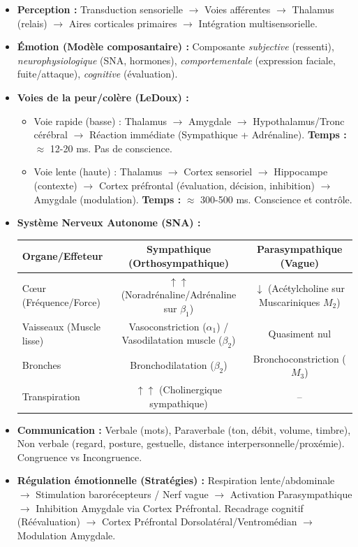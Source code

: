 \documentclass[11pt]{article}
\newcommand{\cle}[1]{{\popxbold\color{popdark}#1}}
\newcounter{popsec}
\newcounter{popsub}
\newcommand{\courssub}[1]{%
  \stepcounter{popsub}%
  \par\vspace{9pt}\noindent{\popxbold\fontsize{11.5}{13}\selectfont\color{popink}{\color{poporange}\thepopsec.\thepopsub}\hspace{6pt}#1}\par\nopagebreak\vspace{4pt}
}
\begin{document}
\courssub{Ressources à mobiliser}
\begin{itemize}
    \item \textbf{Perception :} Transduction sensorielle $\rightarrow$ Voies afférentes $\rightarrow$ Thalamus (relais) $\rightarrow$ Aires corticales primaires $\rightarrow$ Intégration multisensorielle.
    \item \textbf{Émotion (Modèle composantaire) :} Composante \emph{subjective} (ressenti), \emph{neurophysiologique} (SNA, hormones), \emph{comportementale} (expression faciale, fuite/attaque), \emph{cognitive} (évaluation).
    \item \textbf{Voies de la peur/colère (LeDoux) :}
        \begin{itemize}
            \item \cle{Voie rapide (basse)} : Thalamus $\rightarrow$ Amygdale $\rightarrow$ Hypothalamus/Tronc cérébral $\rightarrow$ Réaction immédiate (Sympathique + Adrénaline). \textbf{Temps :} $\approx$ 12-20 ms. Pas de conscience.
            \item \cle{Voie lente (haute)} : Thalamus $\rightarrow$ Cortex sensoriel $\rightarrow$ Hippocampe (contexte) $\rightarrow$ Cortex préfrontal (évaluation, décision, inhibition) $\rightarrow$ Amygdale (modulation). \textbf{Temps :} $\approx$ 300-500 ms. Conscience et contrôle.
        \end{itemize}
    \item \textbf{Système Nerveux Autonome (SNA) :}
        \begin{center}
            \begin{tabular}{|l|c|c|}\hline
            \textbf{Organe/Effeteur} & \textbf{Sympathique (Orthosympathique)} & \textbf{Parasympathique (Vague)} \\ \hline
            Cœur (Fréquence/Force) & $\uparrow\uparrow$ (Noradrénaline/Adrénaline sur $\beta_1$) & $\downarrow$ (Acétylcholine sur Muscariniques $M_2$) \\ \hline
            Vaisseaux (Muscle lisse) & Vasoconstriction ($\alpha_1$) / Vasodilatation muscle ($\beta_2$) & Quasiment nul \\ \hline
            Bronches & Bronchodilatation ($\beta_2$) & Bronchoconstriction ($M_3$) \\ \hline
            Transpiration & $\uparrow\uparrow$ (Cholinergique sympathique) & -- \\ \hline
            \end{tabular}
        \end{center}
    \item \textbf{Communication :} \cle{Verbale} (mots), \cle{Paraverbale} (ton, débit, volume, timbre), \cle{Non verbale} (regard, posture, gestuelle, distance interpersonnelle/proxémie). \cle{Congruence} vs \cle{Incongruence}.
    \item \textbf{Régulation émotionnelle (Stratégies) :} \cle{Respiration lente/abdominale} $\rightarrow$ Stimulation barorécepteurs / Nerf vague $\rightarrow$ Activation Parasympathique $\rightarrow$ Inhibition Amygdale via Cortex Préfrontal. \cle{Recadrage cognitif (Réévaluation)} $\rightarrow$ Cortex Préfrontal Dorsolatéral/Ventromédian $\rightarrow$ Modulation Amygdale.
\end{itemize}
\end{document}
